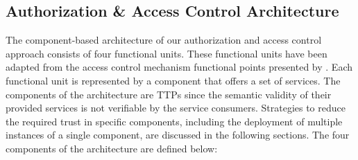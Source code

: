 \subsection{Authorization \& Access Control Architecture}
\label{sec:approach:sabaac:architecture}
The component-based architecture of our authorization and access control approach consists of four functional units.
These functional units have been adapted from the access control mechanism functional points presented by \citeauthor{Hu2014} \cite{Hu2014}.
Each functional unit is represented by a component that offers a set of services.
The components of the architecture are TTPs since the semantic validity of their provided services is not verifiable by the service consumers.
Strategies to reduce the required trust in specific components, including the deployment of multiple instances of a single component, are discussed in the following sections.
The four components of the architecture are defined below:

